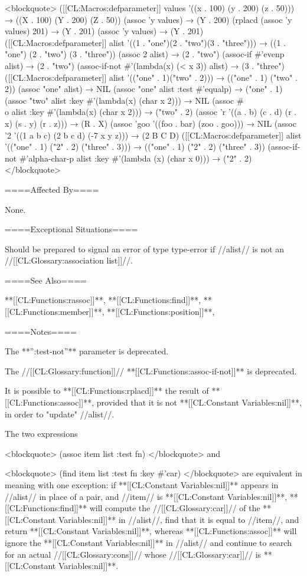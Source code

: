 <blockquote> ([[CL:Macros:defparameter]] values '((x . 100) (y . 200) (z . 50))) → ((X . 100) (Y . 200) (Z . 50)) (assoc 'y values) → (Y . 200) (rplacd (assoc 'y values) 201) → (Y . 201) (assoc 'y values) → (Y . 201) ([[CL:Macros:defparameter]] alist '((1 . "one")(2 . "two")(3 . "three"))) → ((1 . "one") (2 . "two") (3 . "three")) (assoc 2 alist) → (2 . "two") (assoc-if #'evenp alist) → (2 . "two") (assoc-if-not #'(lambda(x) (< x 3)) alist) → (3 . "three") ([[CL:Macros:defparameter]] alist '(("one" . 1)("two" . 2))) → (("one" . 1) ("two" . 2)) (assoc "one" alist) → NIL (assoc "one" alist :test #'equalp) → ("one" . 1) (assoc "two" alist :key #'(lambda(x) (char x 2))) → NIL (assoc #\\o alist :key #'(lambda(x) (char x 2))) → ("two" . 2) (assoc 'r '((a . b) (c . d) (r . x) (s . y) (r . z))) → (R . X) (assoc 'goo '((foo . bar) (zoo . goo))) → NIL (assoc '2 '((1 a b c) (2 b c d) (-7 x y z))) → (2 B C D) ([[CL:Macros:defparameter]] alist '(("one" . 1) ("2" . 2) ("three" . 3))) → (("one" . 1) ("2" . 2) ("three" . 3)) (assoc-if-not #'alpha-char-p alist :key #'(lambda (x) (char x 0))) → ("2" . 2) </blockquote>

====Affected By====

None.

====Exceptional Situations====

Should be prepared to signal an error of type type-error if //alist// is not an //[[CL:Glossary:association list]]//.

====See Also====

**[[CL:Functions:rassoc]]**, **[[CL:Functions:find]]**, **[[CL:Functions:member]]**, **[[CL:Functions:position]]**,

{\secref\TraversalRules}

====Notes====

The **'':test-not''** parameter is deprecated.

The //[[CL:Glossary:function]]// **[[CL:Functions:assoc-if-not]]** is deprecated.

It is possible to **[[CL:Functions:rplacd]]** the result of **[[CL:Functions:assoc]]**, provided that it is not **[[CL:Constant Variables:nil]]**, in order to "update" //alist//.

The two expressions

<blockquote> (assoc item list :test fn) </blockquote> and

<blockquote> (find item list :test fn :key #'car) </blockquote> are equivalent in meaning with one exception: if **[[CL:Constant Variables:nil]]** appears in //alist// in place of a pair, and //item// is **[[CL:Constant Variables:nil]]**, **[[CL:Functions:find]]** will compute the //[[CL:Glossary:car]]// of the **[[CL:Constant Variables:nil]]** in //alist//, find that it is equal to //item//, and return **[[CL:Constant Variables:nil]]**, whereas **[[CL:Functions:assoc]]** will ignore the **[[CL:Constant Variables:nil]]** in //alist// and continue to search for an actual //[[CL:Glossary:cons]]// whose //[[CL:Glossary:car]]// is **[[CL:Constant Variables:nil]]**.

     
